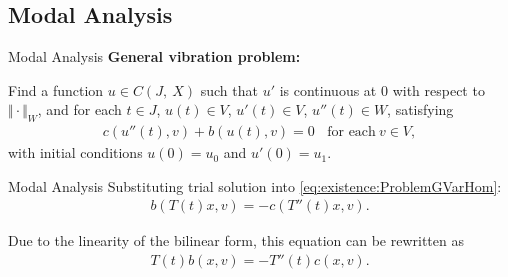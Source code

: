 \documentclass[8pt]{beamer}
\begin{document}
    \subsection{Modal Analysis}
        \begin{frame}{Modal Analysis}
            \textbf{General vibration problem:}
        
            Find a function $u \in C(J,\ X)$ such that $u'$ is continuous at $0$ with respect to $\Vert \cdot \Vert_{W}$, and for each $t \in J$, $u(t) \in V$, $u'(t) \in V$, $u''(t) \in W$, satisfying
            \begin{eqnarray}
                c(u''(t),v)+b(u(t),v) = 0 \ \ \ \ \textrm{for each} \ v \in V, \label{eq:existence:ProblemGVarHom}
            \end{eqnarray}
            with initial conditions $u(0) = u_0$ and $u'(0) = u_1$.
        
        \end{frame}
        
        \begin{frame}{Modal Analysis}
           Substituting trial solution into \eqref{eq:existence:ProblemGVarHom}:
           \begin{eqnarray*}
                b(T(t)x,v) = - c(T''(t)x,v).  \label{eq:existence:ProblemGVarHom:Substitution}
            \end{eqnarray*}
        
            Due to the linearity of the bilinear form, this equation can be rewritten as
            \begin{eqnarray*}
                T(t)b(x,v) = - T''(t)c(x,v).
            \end{eqnarray*}
        
        

        \end{frame}
        
\end{document}

